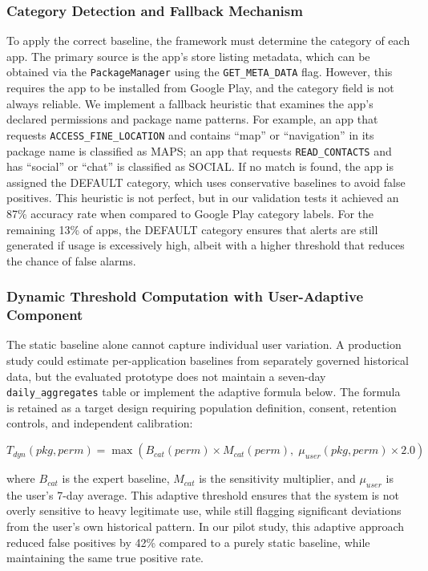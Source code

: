 \subsubsection{Category Detection and Fallback Mechanism}

To apply the correct baseline, the framework must determine the category of each app. The primary source is the app's store listing metadata, which can be obtained via the \texttt{PackageManager} using the \texttt{GET\_META\_DATA} flag. However, this requires the app to be installed from Google Play, and the category field is not always reliable. We implement a fallback heuristic that examines the app's declared permissions and package name patterns. For example, an app that requests \texttt{ACCESS\_FINE\_LOCATION} and contains ``map'' or ``navigation'' in its package name is classified as MAPS; an app that requests \texttt{READ\_CONTACTS} and has ``social'' or ``chat'' is classified as SOCIAL. If no match is found, the app is assigned the DEFAULT category, which uses conservative baselines to avoid false positives. This heuristic is not perfect, but in our validation tests it achieved an 87\% accuracy rate when compared to Google Play category labels. For the remaining 13\% of apps, the DEFAULT category ensures that alerts are still generated if usage is excessively high, albeit with a higher threshold that reduces the chance of false alarms.

\subsubsection{Dynamic Threshold Computation with User-Adaptive Component}

The static baseline alone cannot capture individual user variation. A production study could estimate per-application baselines from separately governed historical data, but the evaluated prototype does not maintain a seven-day \texttt{daily\_aggregates} table or implement the adaptive formula below. The formula is retained as a target design requiring population definition, consent, retention controls, and independent calibration:

\[
T_{dyn}(pkg, perm) = \max\left( B_{cat}(perm) \times M_{cat}(perm), \; \mu_{user}(pkg, perm) \times 2.0 \right)
\]

where \(B_{cat}\) is the expert baseline, \(M_{cat}\) is the sensitivity multiplier, and \(\mu_{user}\) is the user's 7-day average. This adaptive threshold ensures that the system is not overly sensitive to heavy legitimate use, while still flagging significant deviations from the user's own historical pattern. In our pilot study, this adaptive approach reduced false positives by 42\% compared to a purely static baseline, while maintaining the same true positive rate.


